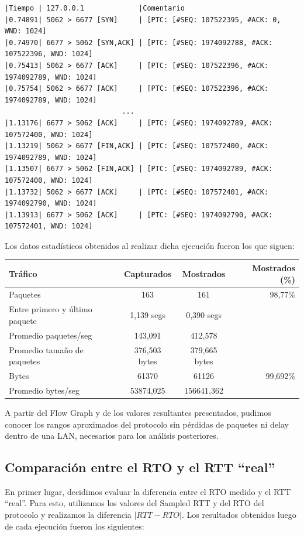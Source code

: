 \documentclass[10pt, a4paper]{article}
\begin{document}
\begin{verbatim}
|Tiempo | 127.0.0.1             |Comentario
|0.74891| 5062 > 6677 [SYN]     | [PTC: [#SEQ: 107522395, #ACK: 0, WND: 1024]
|0.74970| 6677 > 5062 [SYN,ACK] | [PTC: [#SEQ: 1974092788, #ACK: 107522396, WND: 1024]
|0.75413| 5062 > 6677 [ACK]     | [PTC: [#SEQ: 107522396, #ACK: 1974092789, WND: 1024]
|0.75754| 5062 > 6677 [ACK]     | [PTC: [#SEQ: 107522396, #ACK: 1974092789, WND: 1024]	
							...
|1.13176| 6677 > 5062 [ACK]     | [PTC: [#SEQ: 1974092789, #ACK: 107572400, WND: 1024]
|1.13219| 5062 > 6677 [FIN,ACK]	| [PTC: [#SEQ: 107572400, #ACK: 1974092789, WND: 1024]
|1.13507| 6677 > 5062 [FIN,ACK]	| [PTC: [#SEQ: 1974092789, #ACK: 107572400, WND: 1024]					
|1.13732| 5062 > 6677 [ACK]     | [PTC: [#SEQ: 107572401, #ACK: 1974092790, WND: 1024]
|1.13913| 6677 > 5062 [ACK]     | [PTC: [#SEQ: 1974092790, #ACK: 107572401, WND: 1024]
\end{verbatim}

Los datos estadísticos obtenidos al realizar dicha ejecución fueron los que siguen:\\

\begin{tabular}{l | c | c  | r}
\textbf{Tráfico} & \textbf{Capturados} & \textbf{Mostrados} & \textbf{Mostrados (\%)}\\
\hline
Paquetes & 163 & 161 & 98,77\%\\
\hline
Entre primero y último paquete & 1,139 segs & 0,390 segs & \\
\hline
Promedio paquetes/seg & 143,091 & 412,578 & \\
\hline
Promedio tamaño de paquetes & 376,503 bytes & 379,665 bytes & \\
\hline
Bytes & 61370 & 61126 & 99,692\% \\
\hline
Promedio bytes/seg & 53874,025 & 156641,362 & \\
\hline
\end{tabular}


A partir del Flow Graph y de los valores resultantes presentados, pudimos conocer los rangos aproximados del protocolo sin pérdidas de paquetes ni delay dentro de una LAN, necesarios para los análisis posteriores.
\newpage
\subsection{Comparación entre el RTO y el RTT ``real''}

En primer lugar, decidimos evaluar la diferencia entre el RTO medido y el RTT ``real''. Para esto, utilizamos los valores del Sampled RTT y del RTO del protocolo y realizamos la diferencia $|RTT-RTO|$. 
Los resultados obtenidos luego de cada ejecución fueron los siguientes:
\end{document}
